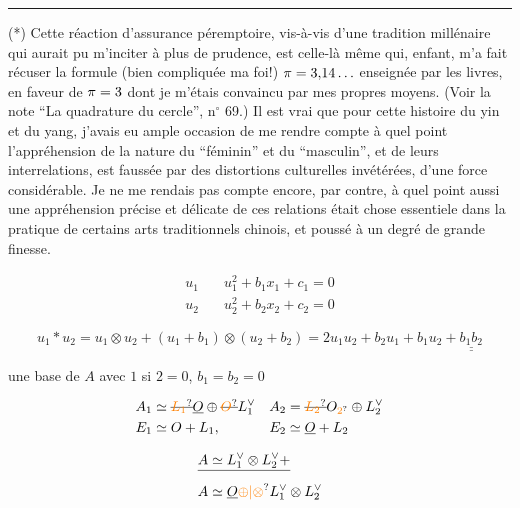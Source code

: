 \noindent\rule{.22\linewidth}{.4pt}\par
(*) Cette réaction d'assurance péremptoire, vis-à-vis d'une tradition millénaire qui aurait pu m'inciter à plus de prudence, est celle-là même qui, enfant, m'a fait récuser la formule (bien compliquée ma foi!) $\pi=3{,}14\ldots$ enseignée par les livres, en faveur de $\pi=3$ dont je m'étais convaincu par mes propres moyens. (Voir la note ``La quadrature du cercle'', n$^\circ$ 69.) Il est vrai que pour cette histoire du yin et du yang, j'avais eu ample occasion de me rendre compte à quel point l'appréhension de la nature du ``féminin'' et du ``masculin'', et de leurs interrelations, est faussée par des distortions culturelles invétérées, d'une force considérable. Je ne me rendais pas compte encore, par contre, à quel point aussi une appréhension précise et délicate de ces relations était chose essentiele dans la pratique de certains arts traditionnels chinois, et poussé à un degré de grande finesse.


\[
\begin{aligned}
u_1&\quad u_1^2+b_1 x_1+c_1=0\\
u_2&\quad u_2^2+b_2x_2+c_2=0
\end{aligned}
\]

\[ u_1*u_2=u_1\otimes u_2+(u_1+b_1)\otimes(u_2+b_2)=2u_1u_2+b_2u_1+b_1u_2+\underline{\underline{b_1b_2}} \]

   une base de $A$ avec $1$  si $2=0$, $b_1=b_2=0$

\[
\begin{aligned}
A_1&\simeq\deleted{\unsure{L_1}}\underline O\oplus\deleted{\unsure{O}}L_1^\vee &
 A_2&=\deleted{\unsure{L_2}}O_{\unsure{2}}\oplus L_2^\vee\\
E_1&\simeq O+L_1, & E_2&\simeq\underline O+L_2
\end{aligned}
\]

\[
\begin{aligned}
&\deleted{A\simeq L_1^\vee\otimes L_2^\vee+}\\
&A\simeq\underline O\unsure{\oplus|\otimes} L_1^\vee\otimes L_2^\vee
\end{aligned}
\]


